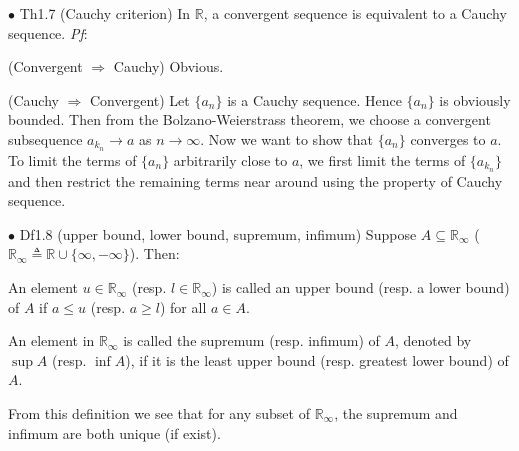 \documentclass{article}
\begin{document}
\begin{Th}{$\bullet$ Th1.7 (Cauchy criterion)}
    In $\mathbb{R}$, a convergent sequence is equivalent to a Cauchy sequence.
    \tcblower
    \textit{Pf}: 
    \begin{compactenum}
        \item (Convergent $\Rightarrow$ Cauchy) Obvious.
        \item (Cauchy $\Rightarrow$ Convergent) Let $\{a_n\}$ is a Cauchy sequence. Hence $\{a_n\}$ is obviously bounded. Then from the Bolzano-Weierstrass theorem, we choose a convergent subsequence $a_{k_n} \rightarrow a$ as $n\to \infty$. Now we want to show that $\{a_n\}$ converges to $a$. To limit the terms of $\{a_n\}$ arbitrarily close to $a$, we first limit the terms of $\{a_{k_n}\}$ and then restrict the remaining terms near around using the property of Cauchy sequence.
    \end{compactenum}
\end{Th}

\begin{Df}{$\bullet$ Df1.8 (upper bound, lower bound, supremum, infimum)}
    Suppose $A\subseteq\mathbb{R}_\infty$ (\textcolor{Df}{$\mathbb{R}_\infty\triangleq\mathbb{R}\cup\{\infty, -\infty\}$}). Then:
    \begin{compactenum}
        \item An element $u\in\mathbb{R}_\infty$ (resp. $l\in\mathbb{R}_\infty$) is called an upper bound (resp. a lower bound) of $A$ if $a\leq u$ (resp. $a\geq l$) for all $a\in A$.
        \item An element in $\mathbb{R}_\infty$ is called the supremum (resp. infimum) of $A$, denoted by $\sup A$ (resp. $\inf A$), if it is the least upper bound (resp. greatest lower bound) of $A$.
    \end{compactenum}
\end{Df}

\begin{Rmk}{}
    From this definition we see that \textcolor{Th}{for any subset of $\mathbb{R}_\infty$, the supremum and infimum are both unique (if exist).}
\end{Rmk}
\end{document}
